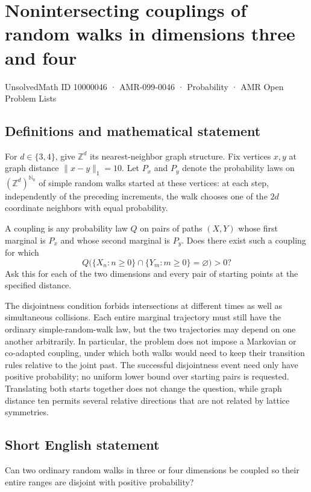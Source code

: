 \documentclass[11pt,a4paper]{article}
\begin{document}
\section*{Nonintersecting couplings of random walks in dimensions three and four}\label{10000046}
{\small UnsolvedMath ID 10000046 · AMR-099-0046 · Probability · AMR Open Problem Lists}
\subsection{Definitions and mathematical statement}
For $d\in\{3,4\}$, give $\mathbb Z^d$ its nearest-neighbor graph structure. Fix vertices $x,y$ at graph distance $\|x-y\|_1=10$. Let $P_x$ and $P_y$ denote the probability laws on $(\mathbb Z^d)^{\mathbb N_0}$ of simple random walks started at these vertices: at each step, independently of the preceding increments, the walk chooses one of the $2d$ coordinate neighbors with equal probability.

A coupling is any probability law $Q$ on pairs of paths $(X,Y)$ whose first marginal is $P_x$ and whose second marginal is $P_y$. Does there exist such a coupling for which
\[
Q\bigl(\{X_n:n\ge0\}\cap\{Y_m:m\ge0\}=\varnothing\bigr)>0?
\]
Ask this for each of the two dimensions and every pair of starting points at the specified distance.

The disjointness condition forbids intersections at different times as well as simultaneous collisions. Each entire marginal trajectory must still have the ordinary simple-random-walk law, but the two trajectories may depend on one another arbitrarily. In particular, the problem does not impose a Markovian or co-adapted coupling, under which both walks would need to keep their transition rules relative to the joint past. The successful disjointness event need only have positive probability; no uniform lower bound over starting pairs is requested. Translating both starts together does not change the question, while graph distance ten permits several relative directions that are not related by lattice symmetries.
\subsection{Short English statement}
Can two ordinary random walks in three or four dimensions be coupled so their entire ranges are disjoint with positive probability?
\end{document}
